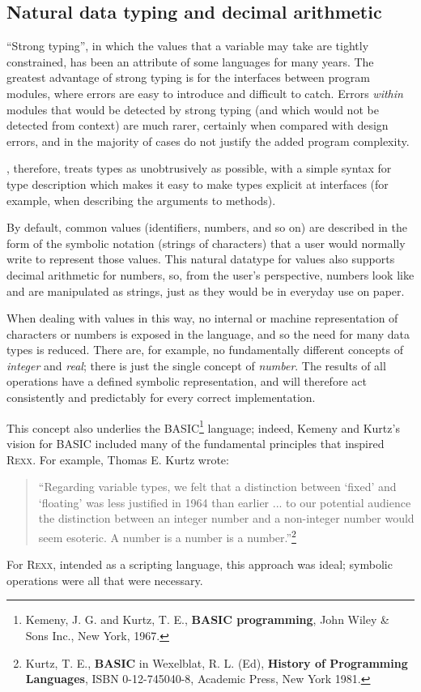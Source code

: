 \subsection{Natural data typing and decimal arithmetic}
“Strong typing”, in which the values that a variable may take are
tightly constrained, has been an attribute of some languages for many
years. The greatest advantage of strong typing is for the interfaces
between program modules, where errors are easy to introduce and
difficult to catch. Errors \emph{within} modules that would be
detected by strong typing (and which would not be detected from
context) are much rarer, certainly when compared with design errors,
and in the majority of cases do not justify the added program
complexity.

\nr{}, therefore, treats types as unobtrusively as possible, with a simple syntax for type description which makes it easy to make types explicit at interfaces (for example, when describing the arguments to methods).

By default, common values (identifiers, numbers, and so on) are described in the form of the symbolic notation (strings of characters) that a user would normally write to represent those values. This natural datatype for values also supports decimal arithmetic for numbers, so, from the user’s perspective, numbers look like and are manipulated as strings, just as they would be in everyday use on paper.

When dealing with values in this way, no internal or machine
representation of characters or numbers is exposed in the language,
and so the need for many data types is reduced. There are, for
example, no fundamentally different concepts of \emph{integer} and
\emph{real}; there is just the single concept of \emph{number}. The
results of all operations have a defined symbolic representation, and
will therefore act consistently and predictably for every correct
implementation.

This concept also underlies the BASIC\footnote{Kemeny, J. G. and
  Kurtz, T. E., \textbf{BASIC programming}, John Wiley \& Sons Inc.,
  New York, 1967.} language; indeed, Kemeny and Kurtz's vision for
BASIC included many of the fundamental principles that inspired
R\textsc{exx}. For example, Thomas E. Kurtz wrote:
\begin{quote}
“Regarding variable types, we felt that a distinction between ‘fixed’
and ‘floating’ was less justified in 1964 than earlier ... to our
potential audience the distinction between an integer number and a
non-integer number would seem esoteric. A number is a number is a
number.”\footnote{Kurtz, T. E., \textbf{BASIC} in Wexelblat,
  R. L. (Ed), \textbf{History of Programming Languages}, ISBN
  0-12-745040-8, Academic Press, New York 1981.}
\end{quote}
For R\textsc{exx}, intended as a scripting language, this approach was ideal; symbolic operations were all that were necessary.

